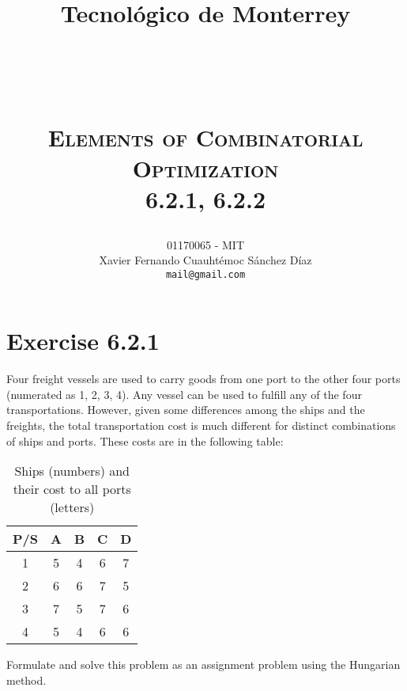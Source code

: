 \documentclass[titlepage, letterpaper, fleqn]{article}
\title{
\vspace{1in}
\textbf{Tecnológico de Monterrey} \\
\vspace{0.5in}
\textmd{\mahclass} \\
\large{\textit{\mahteacher}} \\
\vspace{0.5in}
\textsc{\mahtitle}\\
\textsc{Elements of Combinatorial Optimization}\\
\textsc{6.2.1, 6.2.2}\\
\author{01170065  - MIT \\
Xavier Fernando Cuauhtémoc Sánchez Díaz \\
\texttt{mail@gmail.com}}
\date{\mahdate}
}
\newcommand{\spacepls}{\vspace{5mm}}
\begin{document}
\begin{titlepage}
\maketitle
\end{titlepage}

%
%

\section{Exercise 6.2.1}

{\large Four freight vessels are used to carry goods from one port to the other four ports (numerated as 1, 2, 3, 4).
Any vessel can be used to fulfill any of the four transportations.
However, given some differences among the ships and the freights,
the total transportation cost is much different for distinct combinations of ships and ports.
These costs are in the following table:}

\begin{table}[h!]
\centering
\begin{tabular}{@{}ccccc@{}}
\toprule
P/S & A & B & C & D \\ \midrule
1   & 5 & 4 & 6 & 7 \\
2   & 6 & 6 & 7 & 5 \\
3   & 7 & 5 & 7 & 6 \\
4   & 5 & 4 & 6 & 6 \\ \bottomrule
\end{tabular}
\caption{Ships (numbers) and their cost to all ports (letters)}
\label{tab:6.2.1}
\end{table}

{\large Formulate and solve this problem as an assignment problem using the Hungarian method.}

\spacepls
\end{document}
